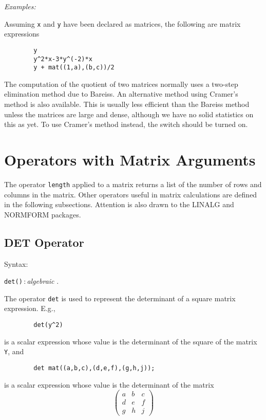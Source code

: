 \textit{Examples:}

Assuming \texttt{x} and \texttt{y} have been declared as matrices, the following
are matrix expressions
\begin{verbatim}
        y
        y^2*x-3*y^(-2)*x
        y + mat((1,a),(b,c))/2
\end{verbatim}
\hypertarget{switch:CRAMER}{}
The computation of the quotient of two matrices normally uses a two-step
elimination method due to Bareiss.  An alternative method using Cramer's
method is also available.  This is usually less efficient than the Bareiss
method unless the matrices are large and dense, although we have no solid
statistics on this as yet.  To use Cramer's method instead, the switch
 should be turned on.


\section{Operators with Matrix Arguments}
\label{sec:core-matrix-operators}

The operator \texttt{length} applied to a matrix returns a
list of the number of rows and columns in the matrix.  Other operators
useful in matrix calculations are defined in the following subsections.
Attention is also drawn to the LINALG
 and NORMFORM
 packages.

\subsection{DET Operator}
\hypertarget{operator:DET}{}
Syntax:
\begin{syntax}
        \texttt{det(}\texttt{)}\,:\,\textit{algebraic} .
\end{syntax}

The operator \texttt{det} is used to represent the determinant of a square
matrix expression.  E.g.,
\begin{verbatim}
        det(y^2)
\end{verbatim}
is a scalar expression whose value is the determinant of the square of the
matrix \texttt{Y}, and
\begin{verbatim}
        det mat((a,b,c),(d,e,f),(g,h,j));
\end{verbatim}
is a scalar expression whose value is the determinant of the matrix
\[ \left( \begin{array}{lcr} a & b & c \\ d & e & f \\ g & h & j
\end{array} \right) \]

